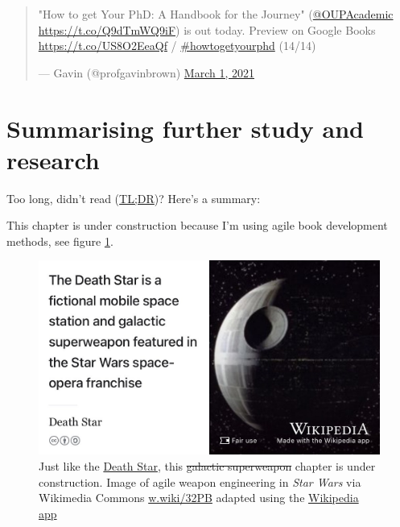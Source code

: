 \documentclass[
]{book}
\begin{document}
\begin{quote}
"How to get Your PhD: A Handbook for the Journey"
(\href{https://twitter.com/OUPAcademic}{@OUPAcademic}
\url{https://t.co/Q9dTmWQ9iF}) is out today. Preview on Google Books
\url{https://t.co/US8O2EeaQf} /
\href{https://twitter.com/hashtag/howtogetyourphd}{\#howtogetyourphd}
(14/14)

--- Gavin (@profgavinbrown) \href{https://twitter.com/profgavinbrown/status/1366390620504399872}{March 1,
2021}
\end{quote}

\hypertarget{tldr12}{%
\section{Summarising further study and research}\label{tldr12}}

Too long, didn't read (\href{https://en.wiktionary.org/wiki/too_long;_didn\%27t_read}{TL;DR})? Here's a summary:

This chapter is under construction because I'm using agile book development methods, see figure \ref{fig:deathstar9-fig}.

\begin{figure}

{\centering \includegraphics[width=0.99\linewidth]{images/DeathStar2} 

}

\caption{Just like the \href{https://en.wikipedia.org/wiki/Death_Star}{Death Star}, this \sout{galactic superweapon} chapter is under construction. Image of agile weapon engineering in \emph{Star Wars} via Wikimedia Commons \href{https://w.wiki/32PB}{w.wiki/32PB} adapted using the \href{https://apps.apple.com/gb/app/wikipedia/id324715238}{Wikipedia app}}\label{fig:deathstar9-fig}
\end{figure}
\end{document}
